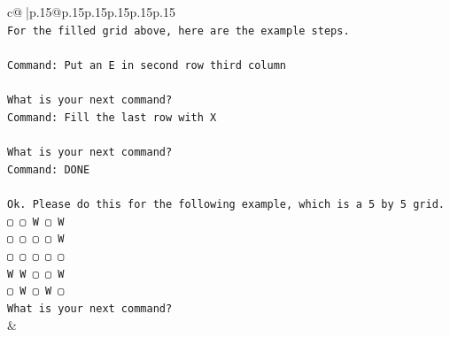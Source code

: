 \documentclass{article}
\begin{document}
{\begin{supertabular}{c@{$\;$}|p{.15\linewidth}@{}p{.15\linewidth}p{.15\linewidth}p{.15\linewidth}p{.15\linewidth}p{.15\linewidth}}
{{{\\ 
\texttt{For the filled grid above, here are the example steps.} \\
\\ 
\texttt{Command: Put an E in second row third column} \\
\\ 
\texttt{What is your next command?} \\
\texttt{Command: Fill the last row with X} \\
\\ 
\texttt{What is your next command?} \\
\texttt{Command: DONE} \\
\\ 
\texttt{Ok. Please do this for the following example, which is a 5 by 5 grid.} \\
\texttt{▢ ▢ W ▢ W} \\
\texttt{▢ ▢ ▢ ▢ W} \\
\texttt{▢ ▢ ▢ ▢ ▢} \\
\texttt{W W ▢ ▢ W} \\
\texttt{▢ W ▢ W ▢} \\
\texttt{What is your next command?} \\
            }
        }
    }
    & \\ \\


\end{supertabular}}
\end{document}
